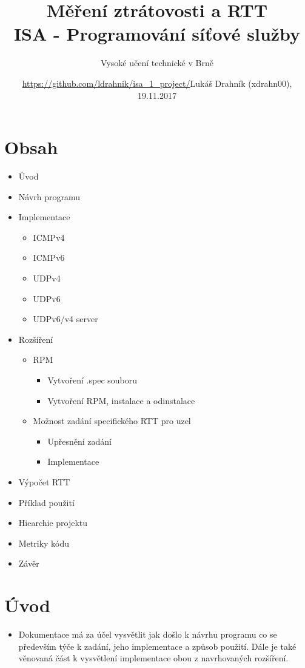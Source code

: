 \documentclass[a4paper,11pt]{article}
\title{Měření ztrátovosti a RTT\\
{\bf\large ISA - Programování síťové služby}}
\author{Vysoké učení technické v Brně}
\date{\url{https://github.com/ldrahnik/isa_1_project/}}
\date{Lukáš Drahník (xdrahn00), 19.11.2017}
\begin{document}
{\let\newpage\relax\maketitle}

\newpage

\section*{Obsah}
\begin{itemize}
  \item Úvod
  \item Návrh programu
  \item Implementace
  \begin{itemize}
     \item ICMPv4
     \item ICMPv6
     \item UDPv4
     \item UDPv6
     \item UDPv6/v4 server
   \end{itemize}
  \item Rozšíření
  \begin{itemize}
     \item RPM
     \begin{itemize}
        \item Vytvoření .spec souboru
        \item Vytvoření RPM, instalace a odinstalace
     \end{itemize}
     \item Možnost zadání specifického RTT pro uzel
     \begin{itemize}
        \item Upřesnění zadání
        \item Implementace
     \end{itemize}
  \end{itemize}
  \item Výpočet RTT
  \item Příklad použití
  \item Hiearchie projektu
  \item Metriky kódu
  \item Závěr
\end{itemize}

\newpage

\section*{Úvod}
\begin{itemize}
  \item Dokumentace má za účel vysvětlit jak došlo k návrhu programu co se především týče k zadání, jeho implementace a způsob použití. Dále je také věnovaná část k vysvětlení implementace obou z navrhovaných rozšíření.
\end{itemize}
\end{document}
